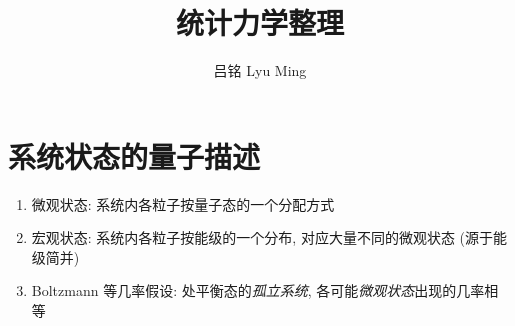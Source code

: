 \documentclass[12pt,a4paper]{article}%
\numberwithin{equation}{section}
\begin{document}
\title{统计力学整理}
\author{吕铭 Lyu Ming}
\maketitle
\tableofcontents
\section{系统状态的量子描述} %
\label{sec:state_of_the_system}
\begin{enumerate}
    \item 微观状态: 
    系统内各粒子按量子态的一个分配方式
    \item  宏观状态: 
    系统内各粒子按能级的一个分布, 
    对应大量不同的微观状态 (源于能级简并)
    \item Boltzmann 等几率假设: 
    处平衡态的\emph{孤立系统}, 各可能\emph{微观状态}出现的几率相等
\end{enumerate}

\end{document}
